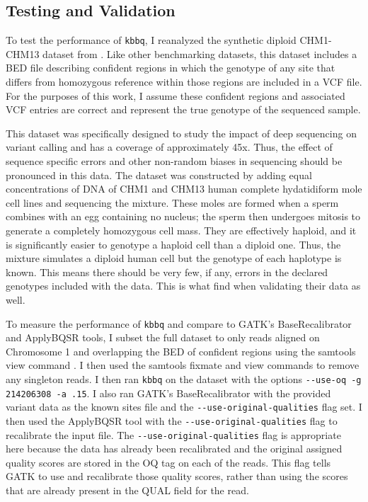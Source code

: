 \subsection{Testing and Validation}
To test the performance of \texttt{kbbq}, I reanalyzed the synthetic diploid CHM1-CHM13 dataset from \cite{li_synthetic-diploid_2018}. Like other benchmarking datasets, this dataset includes a BED file describing confident regions in which the genotype of any site that differs from homozygous reference within those regions are included in a VCF file. For the purposes of this work, I assume these confident regions and associated VCF entries are correct and represent the true genotype of the sequenced sample.

This dataset was specifically designed to study the impact of deep sequencing on variant calling and has a coverage of approximately 45x. Thus, the effect of sequence specific errors and other non-random biases in sequencing should be pronounced in this data.
The dataset was constructed by adding equal concentrations of DNA of CHM1 and CHM13 human complete hydatidiform mole cell lines and sequencing the mixture. These moles are formed when a sperm combines with an egg containing no nucleus; the sperm then undergoes mitosis to generate a completely homozygous cell mass. They are effectively haploid, and it is significantly easier to genotype a haploid cell than a diploid one. Thus, the mixture simulates a diploid human cell but the genotype of each haplotype is known. This means there should be very few, if any, errors in the declared genotypes included with the data. This is what \cite{li_synthetic-diploid_2018} find when validating their data as well.

To measure the performance of \texttt{kbbq} and compare to GATK's BaseRecalibrator and ApplyBQSR tools, I subset the full dataset to only reads aligned on Chromosome 1 and overlapping the BED of confident regions using the samtools view command \parencite{li_sequence_2009}. I then used the samtools fixmate and view commands to remove any singleton reads. I then ran \texttt{kbbq} on the dataset with the options \texttt{-\phantom{}-use-oq -g 214206308 -a .15}. I also ran GATK's BaseRecalibrator with the provided variant data as the known sites file and the \texttt{-\phantom{}-use-original-qualities} flag set. I then used the ApplyBQSR tool with the \texttt{-\phantom{}-use-original-qualities} flag to recalibrate the input file. The \texttt{-\phantom{}-use-original-qualities} flag is appropriate here because the data has already been recalibrated and the original assigned quality scores are stored in the OQ tag on each of the reads. This flag tells GATK to use and recalibrate those quality scores, rather than using the scores that are already present in the QUAL field for the read.

